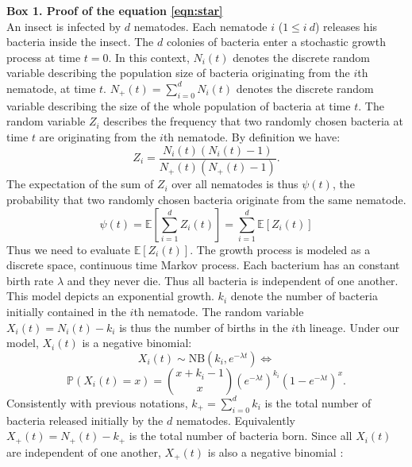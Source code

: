 \documentclass[10pt]{article}
\newcommand{\pr}{{\mathbb{P}}}
\begin{document}
\begin{boxframe}
\label{box_psi_simultaneous}
\begin{multicols}{2}
\textbf{Box 1. Proof of the equation \eqref{eqn:star}\\}
An insect is infected by $d$ nematodes. 
Each nematode $i$ ($ 1 \leq i \ d$) releases his bacteria inside the insect. 
The $d$ colonies of bacteria enter a stochastic growth process at time $t=0$.
In this context, $N_i(t)$ denotes the discrete random variable describing the population size of bacteria originating from the $i$th nematode, at time $t$. 
$N_+(t)=\sum_{i=0}^d N_i(t)$ denotes the discrete random variable describing the size of the whole population of bacteria at time $t$. 
The random variable $Z_i$ describes the frequency that two randomly chosen bacteria at time $t$ are originating from the $i$th nematode. 
By definition we have:
\begin{equation}
Z_i=\dfrac{N_i(t)(N_i(t)-1)}{N_+(t)( N_+(t)-1 ) }.
\end{equation} 
The expectation of the sum of $Z_i$ over all nematodes is thus $\psi (t)$, the probability 
that two randomly chosen bacteria originate from the same nematode. 
\begin{equation}
\psi(t) = \mathbb{E} \left[ \sum_{i=1}^d Z_i(t) \right] = \sum_{i=1}^d \mathbb{E}[ Z_i(t)]
\end{equation}
Thus we need to evaluate $\mathbb{E}[ Z_i(t)]$. 
The growth process is modeled as a discrete space, continuous time Markov process. Each bacterium has an constant birth rate $\lambda$ and they never die. Thus all bacteria is independent of one another. This model depicts an exponential growth. 
$k_i$ denote the number of bacteria initially contained in the $i$th nematode. The random variable $X_i(t)=N_i(t)-k_i$ is thus the number of births in the $i$th lineage. Under our model, 
$X_i(t)$ is a negative binomial\cite[p. 158]{cox1977theory}:
\begin{equation}
X_i(t) \sim \mathrm{NB} \left( k_i, e^{-\lambda t} \right) \iff
\end{equation}
\begin{equation}
\pr(X_i(t)=x)=\binom{x+k_i -1}{x} \left( e^{-\lambda t} \right)^{k_i} \left( 1-e^{-\lambda t} \right)^{x}.
\end{equation}
Consistently with previous notations, $k_+=\sum_{i=0}^d k_i$ is the total number of bacteria released initially by the $d$ nematodes. 
Equivalently $X_+(t)=N_+(t)-k_+$ is the total number of bacteria born. Since all $X_i(t)$ are independent of one another, $X_+(t)$ is also a negative binomial \cite{johnson2005univariate}:

\end{multicols}
\end{boxframe}
\end{document}
